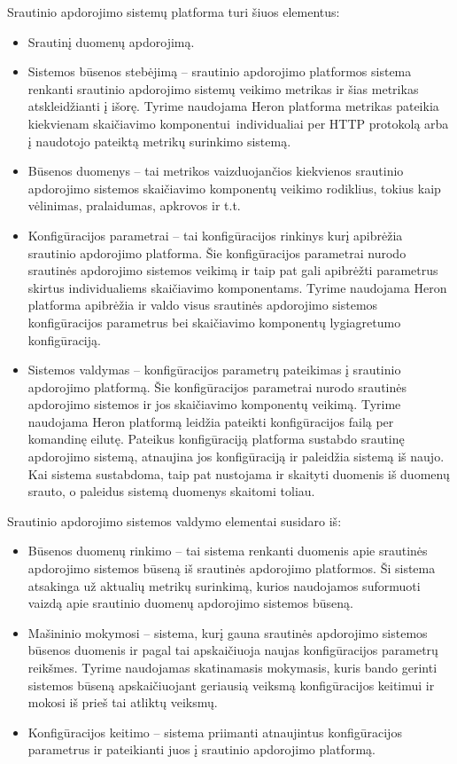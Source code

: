 \documentclass{VUMIFPSbakalaurinis}
\begin{document}
Srautinio apdorojimo sistemų platforma turi šiuos elementus:
\begin{itemize}
    \item Srautinį duomenų apdorojimą.
    \item Sistemos būsenos stebėjimą – srautinio apdorojimo platformos sistema renkanti srautinio apdorojimo sistemų veikimo metrikas ir šias metrikas atskleidžianti į išorę. Tyrime naudojama Heron platforma metrikas pateikia kiekvienam skaičiavimo komponentui individualiai per HTTP protokolą arba į naudotojo pateiktą metrikų surinkimo sistemą.
    \item Būsenos duomenys – tai metrikos vaizduojančios kiekvienos srautinio apdorojimo sistemos skaičiavimo komponentų  veikimo rodiklius, tokius kaip vėlinimas, pralaidumas, apkrovos ir t.t.
    \item Konfigūracijos parametrai – tai konfigūracijos rinkinys kurį apibrėžia srautinio apdorojimo platforma. Šie konfigūracijos parametrai nurodo srautinės apdorojimo sistemos veikimą ir taip pat gali apibrėžti parametrus skirtus individualiems skaičiavimo komponentams. Tyrime naudojama Heron platforma apibrėžia ir valdo visus srautinės apdorojimo sistemos konfigūracijos parametrus bei skaičiavimo komponentų lygiagretumo konfigūraciją.
    \item Sistemos valdymas – konfigūracijos parametrų pateikimas į srautinio apdorojimo platformą. Šie konfigūracijos parametrai nurodo srautinės apdorojimo sistemos ir jos skaičiavimo komponentų veikimą. Tyrime naudojama Heron platformą leidžia pateikti konfigūracijos failą per komandinę eilutę. Pateikus konfigūraciją platforma sustabdo srautinę apdorojimo sistemą, atnaujina jos konfigūraciją ir paleidžia sistemą iš naujo. Kai sistema sustabdoma, taip pat nustojama ir skaityti duomenis iš duomenų srauto, o paleidus sistemą duomenys skaitomi toliau.
\end{itemize}
Srautinio apdorojimo sistemos valdymo elementai susidaro iš:
\begin{itemize}
    \item Būsenos duomenų rinkimo – tai sistema renkanti duomenis apie srautinės apdorojimo sistemos būseną iš srautinės apdorojimo platformos. Ši sistema atsakinga už aktualių metrikų surinkimą, kurios naudojamos suformuoti vaizdą apie srautinio duomenų apdorojimo sistemos būseną.
    \item Mašininio mokymosi – sistema, kurį gauna srautinės apdorojimo sistemos būsenos duomenis ir pagal tai apskaičiuoja naujas konfigūracijos parametrų reikšmes. Tyrime naudojamas skatinamasis mokymasis, kuris bando gerinti sistemos būseną apskaičiuojant geriausią veiksmą konfigūracijos keitimui ir mokosi iš prieš tai atliktų veiksmų.
    \item Konfigūracijos keitimo – sistema priimanti atnaujintus konfigūracijos parametrus ir pateikianti juos į srautinio apdorojimo platformą. 
\end{itemize}
\end{document}
